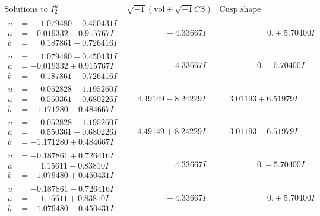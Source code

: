 \documentclass[1p]{elsarticle_modified}
\theoremstyle{definition}
\newcommand{\I}{\sqrt{-1}}
\begin{document}
$$\begin{array}{c|c|c}  
\text{Solutions to }I^u_{2}& \I (\text{vol} + \sqrt{-1}CS) & \text{Cusp shape}\\
 \hline 
\begin{aligned}
u &= \phantom{-}1.079480 + 0.450431 I \\
a &= -0.019332 - 0.915767 I \\
b &= \phantom{-}0.187861 + 0.726416 I\end{aligned}
 & \phantom{-0.000000 } -4.33667 I & \phantom{-0.000000 -}0. + 5.70400 I \\ \hline\begin{aligned}
u &= \phantom{-}1.079480 - 0.450431 I \\
a &= -0.019332 + 0.915767 I \\
b &= \phantom{-}0.187861 - 0.726416 I\end{aligned}
 & \phantom{-0.000000 -}4.33667 I & \phantom{-0.000000 } 0. - 5.70400 I \\ \hline\begin{aligned}
u &= \phantom{-}0.052828 + 1.195260 I \\
a &= \phantom{-}0.550361 + 0.680226 I \\
b &= -1.171280 - 0.484667 I\end{aligned}
 & \phantom{-}4.49149 - 8.24229 I & \phantom{-}3.01193 + 6.51979 I \\ \hline\begin{aligned}
u &= \phantom{-}0.052828 - 1.195260 I \\
a &= \phantom{-}0.550361 - 0.680226 I \\
b &= -1.171280 + 0.484667 I\end{aligned}
 & \phantom{-}4.49149 + 8.24229 I & \phantom{-}3.01193 - 6.51979 I \\ \hline\begin{aligned}
u &= -0.187861 + 0.726416 I \\
a &= \phantom{-}1.15611 - 0.83810 I \\
b &= -1.079480 + 0.450431 I\end{aligned}
 & \phantom{-0.000000 -}4.33667 I & \phantom{-0.000000 } 0. - 5.70400 I \\ \hline\begin{aligned}
u &= -0.187861 - 0.726416 I \\
a &= \phantom{-}1.15611 + 0.83810 I \\
b &= -1.079480 - 0.450431 I\end{aligned}
 & \phantom{-0.000000 } -4.33667 I & \phantom{-0.000000 -}0. + 5.70400 I \\ \hline\begin{aligned}

\end{aligned}
\end{array}$$
\end{document}
